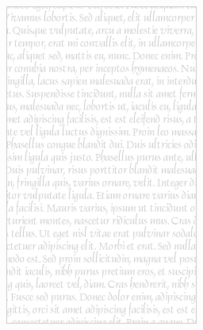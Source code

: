 \begin{figure}[!t]
  \centering
  \begin{minipage}{.49\linewidth}
    \includegraphics[width=\linewidth]{figs/vertical-rectangle-white}
  \end{minipage}
  \hfill
  \begin{minipage}{.49\linewidth}

\end{minipage}
\end{figure}
